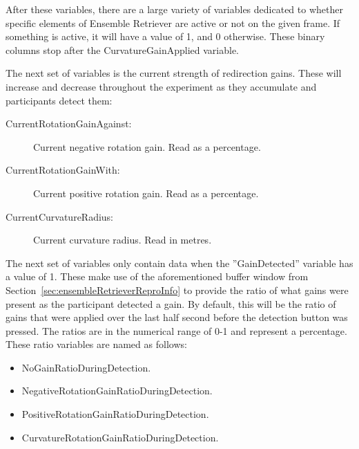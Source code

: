 After these variables, there are a large variety of variables dedicated to whether specific elements of Ensemble Retriever are active or not on the given frame. If something is active, it will have a value of 1, and 0 otherwise. These binary columns stop after the CurvatureGainApplied variable. 

The next set of variables is the current strength of redirection gains. These will increase and decrease throughout the experiment as they accumulate and participants detect them:
\begin{description}
   \item[CurrentRotationGainAgainst:] Current negative rotation gain. Read as a percentage.
   \item[CurrentRotationGainWith:] Current positive rotation gain. Read as a percentage.
   \item[CurrentCurvatureRadius:] Current curvature radius. Read in metres. 
\end{description}

The next set of variables only contain data when the ''GainDetected'' variable has a value of 1. These make use of the aforementioned buffer window from Section~\ref{sec:ensembleRetrieverReproInfo} to provide the ratio of what gains were present as the participant detected a gain. By default, this will be the ratio of gains that were applied over the last half second before the detection button was pressed. The ratios are in the numerical range of 0-1 and represent a percentage. These ratio variables are named as follows:

\begin{itemize}
    \item NoGainRatioDuringDetection.
    \item NegativeRotationGainRatioDuringDetection.
    \item PositiveRotationGainRatioDuringDetection.
    \item CurvatureRotationGainRatioDuringDetection.
\end{itemize}

